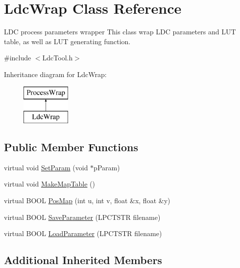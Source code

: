 \hypertarget{class_ldc_wrap}{}\section{Ldc\+Wrap Class Reference}
\label{class_ldc_wrap}


L\+DC process parameters wrapper This class wrap L\+DC parameters and L\+UT table, as well as L\+UT generating function.  




{\ttfamily \#include $<$Ldc\+Tool.\+h$>$}

Inheritance diagram for Ldc\+Wrap\+:\begin{figure}[H]
\begin{center}
\leavevmode
\includegraphics[height=2.000000cm]{class_ldc_wrap}
\end{center}
\end{figure}
\subsection*{Public Member Functions}
\begin{DoxyCompactItemize}
\item 
virtual void \mbox{\hyperlink{class_ldc_wrap_a0e99416d80b36d5da0faaa5a11da9ee7}{Set\+Param}} (void $\ast$p\+Param)
\item 
virtual void \mbox{\hyperlink{class_ldc_wrap_a0c6a77b5857bf0bc57c935b8612df9ad}{Make\+Map\+Table}} ()
\item 
virtual B\+O\+OL \mbox{\hyperlink{class_ldc_wrap_ad427e8c69a36be35bf5b95afa1d4fca3}{Pos\+Map}} (int u, int v, float \&x, float \&y)
\item 
virtual B\+O\+OL \mbox{\hyperlink{class_ldc_wrap_aafd5595ef17a6be3074186204c39a550}{Save\+Parameter}} (L\+P\+C\+T\+S\+TR filename)
\item 
virtual B\+O\+OL \mbox{\hyperlink{class_ldc_wrap_a5409cdfe65bc28ec3779f35eb3af22b4}{Load\+Parameter}} (L\+P\+C\+T\+S\+TR filename)
\end{DoxyCompactItemize}
\subsection*{Additional Inherited Members}


